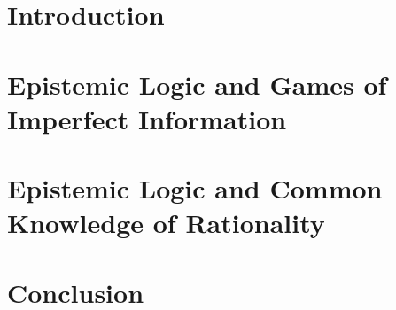 \documentclass[a4paper,11pt]{article}
\author{Andreas David Lauritzen, s134849 \and%
        Christian Hildebrand Grevil, s093434 \and%
       Patrick Kasting, s124313}
\begin{document}

\pagebreak

\tableofcontents
\pagebreak

\section{Introduction}


\section{Epistemic Logic and Games of Imperfect Information} \label{sec:imperfect-information}


\section{Epistemic Logic and Common Knowledge of Rationality} \label{sec:rationality}


\section{Conclusion} \label{sec:conclusion}




\end{document}
